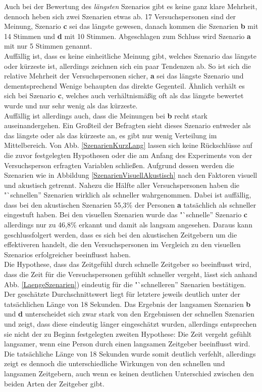 \documentclass{Paper}
\begin{document}
Auch bei der Bewertung des \textit{längsten} Szenarios gibt es keine ganz klare Mehrheit, dennoch heben sich zwei Szenarien etwas ab. 17 Versuchspersonen sind der Meinung, Szenario \textbf{c} sei das längste gewesen, danach kommen die Szenarien \textbf{b} mit 14 Stimmen und \textbf{d} mit 10 Stimmen. Abgeschlagen zum Schluss wird Szenario \textbf{a} mit nur 5 Stimmen genannt.\\
Auffällig ist, dass es keine einheitliche Meinung gibt, welches Szenario das längste oder kürzeste ist, allerdings zeichnen sich ein paar Tendenzen ab. So ist sich die relative Mehrheit der Versuchspersonen sicher, \textbf{a} sei das längste Szenario und dementsprechend Wenige behaupten das direkte Gegenteil. Ähnlich verhält es sich bei Szenario \textbf{c}, welches auch verhältnismäßig oft als das längste bewertet wurde und nur sehr wenig als das kürzeste.\\
Auffällig ist allerdings auch, dass die Meinungen bei \textbf{b} recht stark auseinandergehen. Ein Großteil der Befragten sieht dieses Szenario entweder als das längste oder als das kürzeste an, es gibt nur wenig Verteilung im Mittelbereich.
Von Abb. \ref{SzenarienKurzLang} lassen sich keine Rückschlüsse auf die zuvor festgelegten Hypothesen oder die am Anfang des Experiments von der Versuchsperson erfragten Variablen schließen. Aufgrund dessen werden die Szenarien wie in Abbildung \ref{SzenarienVisuellAkustisch}
nach den Faktoren visuell und akustisch getrennt. Nahezu die Hälfte aller Versuchspersonen haben die "`schnellen'' Szenarien wirklich als schneller wahrgenommen. Dabei ist auffällig, dass bei den akustischen Szenarien 55,3\% der Personen \textbf{a} tatsächlich als schneller eingestuft haben. Bei den visuellen Szenarien wurde das "`schnelle'' Szenario \textbf{c} allerdings nur zu 46,8\% erkannt und damit als langsam angesehen. Daraus kann geschlussfolgert werden, dass es sich bei den akustischen Zeitgebern um die effektiveren handelt, die den Versuchspersonen im Vergleich zu den visuellen Szenarios erfolgreicher beeinflusst haben.\\
Die Hypothese, dass das Zeitgefühl durch schnelle Zeitgeber so beeinflusst
wird, dass die Zeit für die Versuchspersonen gefühlt schneller vergeht, lässt sich anhand Abb. \ref{LaengeSzenarien}) eindeutig für die "`schnelleren'' Szenarien bestätigen. Der geschätzte Durchschnittswert liegt für letztere jeweils deutlich unter der
tatsächlichen Länge von 18 Sekunden. Das Ergebnis der langsamen Szenarien \textbf{b} und
\textbf{d} unterscheidet sich zwar stark von den Ergebnissen der schnellen
Szenarien und zeigt, dass diese eindeutig länger eingeschätzt wurden, allerdings
entsprechen sie nicht der zu Beginn festgelegten zweiten Hypothese: Die Zeit vergeht
gefühlt langsamer, wenn eine Person durch einen langsamen Zeitgeber beeinflusst wird. Die
tatsächliche Länge von 18 Sekunden wurde somit deutlich verfehlt, allerdings zeigt es dennoch
die unterschiedliche Wirkungen von den schnellen und langsamen Zeitgebern, auch wenn es keinen
deutlichen Unterschied zwischen den beiden Arten der Zeitgeber gibt.
       
\end{document}
